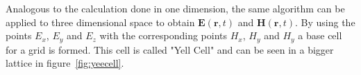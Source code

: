 Analogous to the calculation done in one dimension, the same algorithm can be applied to three dimensional space to obtain $\mathbf{E}(\mathbf{r}, t)$ and $\mathbf{H}(\mathbf{r}, t)$. By using the points $E_x$, $E_y$ and $E_z$ with the corresponding points $H_x$, $H_y$ and $H_y$ a base cell for a grid is formed. This cell is called "Yell Cell" and can be seen in a bigger lattice in figure~\ref{fig:yeecell}.
